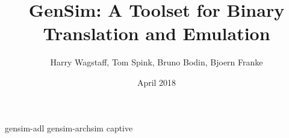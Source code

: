 \documentclass{beamer}
\title %
{GenSim: A Toolset for Binary Translation and Emulation}
\author %
{Harry Wagstaff, Tom Spink, Bruno Bodin, Bjoern Franke}
\institute %
{
	Institute for Computing Systems Architecture \\
	University of Edinburgh
}
\date %
{April 2018}
\begin{document}
	
\begin{frame}
  \titlepage
\end{frame}

\begin{frame}
	\tableofcontents
\end{frame}	

	
	





 {gensim-adl}
 {gensim-archsim}
 {captive}
\end{document}
